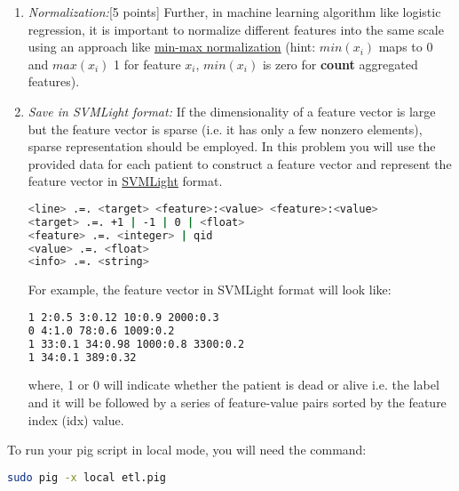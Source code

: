 \documentclass[12pt]{article}
\begin{document}
\begin{enumerate}
\begin{lstlisting}[frame=single]
(2, 1)
(1, 1)
(3, 2)
(4, 4)
\end{lstlisting}

\iffalse
\item \emph{Imputation:}[10 points]
Physicians order lab tests for patient on demand, thus we don't have average lab value as feature if patient don't have such test. This is a missing value problem. For a given feature, if its value is not missing from a few patients(more than 10 patients here in this problem), one can use average value of non-missing to replace missing, this is called the \href{http://missingdata.lshtm.ac.uk/index.php?option=com_content&view=article&id=68:simple-mean-imputation&catid=39:simple-ad-hoc-methods-for-coping-with-missing-data&Itemid=96}{Simple Mean Imputation}.
\fi

\item \emph{Normalization:}[5 points] Further, in machine learning algorithm like logistic regression, it is important to normalize different features into the same scale using an approach like  \href{http://stats.stackexchange.com/questions/70801/how-to-normalize-data-to-0-1-range}{min-max normalization} (hint: $min(x_i)$ maps to 0 and $max(x_i)$ 1 for feature $x_i$, $min(x_i)$ is zero for \textbf{count} aggregated features). 

\item \emph{Save in  SVMLight format:} If the dimensionality of a feature vector is large but the feature vector is sparse (i.e. it has only a few nonzero elements), sparse representation should be employed. In this problem you will use the provided data for each patient to construct a feature vector and represent the feature vector in \href{http://svmlight.joachims.org/}{SVMLight} format. \\

\begin{lstlisting}[frame=single, language=bash]
<line> .=. <target> <feature>:<value> <feature>:<value> 
<target> .=. +1 | -1 | 0 | <float> 
<feature> .=. <integer> | qid
<value> .=. <float>
<info> .=. <string>
\end{lstlisting}

For example, the feature vector in SVMLight format will look like: \\

\begin{lstlisting}[frame=single, language=bash]
1 2:0.5 3:0.12 10:0.9 2000:0.3
0 4:1.0 78:0.6 1009:0.2
1 33:0.1 34:0.98 1000:0.8 3300:0.2
1 34:0.1 389:0.32 
\end{lstlisting}

where, 1 or 0 will indicate whether the patient is dead or alive i.e. the label and it will be followed by a series of feature-value pairs sorted by the feature index (idx) value. 
\newline
\end{enumerate}
To run your pig script in local mode, you will need the command:  
\begin{lstlisting}[frame=single,language=bash]
sudo pig -x local etl.pig
\end{lstlisting}
\end{document}
